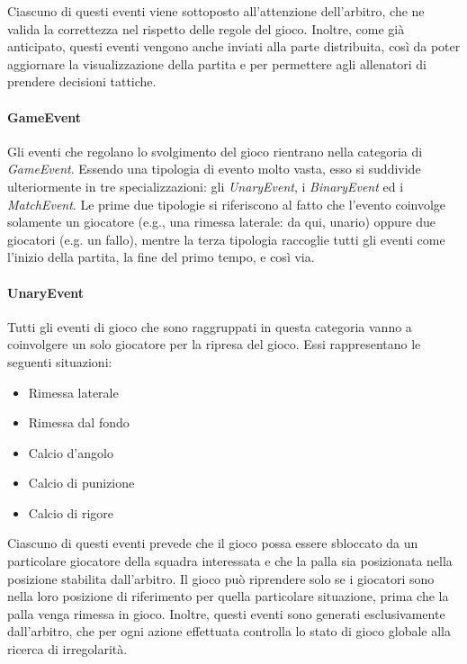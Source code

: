 Ciascuno di questi eventi viene sottoposto all'attenzione dell'arbitro, che ne valida la correttezza nel rispetto delle regole del gioco. Inoltre, come già anticipato, questi eventi vengono anche inviati alla parte distribuita, così da poter aggiornare la visualizzazione della partita e per permettere agli allenatori di prendere decisioni tattiche.

\paragraph{GameEvent} Gli eventi che regolano lo svolgimento del gioco rientrano nella categoria di \textit{GameEvent}. Essendo una tipologia di evento molto vasta, esso si suddivide ulteriormente in tre specializzazioni: gli \textit{UnaryEvent}, i \textit{BinaryEvent} ed i \textit{MatchEvent}. Le prime due tipologie si riferiscono al fatto che l'evento coinvolge solamente un giocatore (e.g., una rimessa laterale: da qui, unario) oppure due giocatori (e.g. un fallo), mentre la terza tipologia raccoglie tutti gli eventi come l'inizio della partita, la fine del primo tempo, e così via.\\

\paragraph{UnaryEvent} Tutti gli eventi di gioco che sono raggruppati in questa categoria vanno a coinvolgere un solo giocatore per la ripresa del gioco. Essi rappresentano le seguenti situazioni:

\begin{itemize}
	\item Rimessa laterale
	\item Rimessa dal fondo
	\item Calcio d'angolo
	\item Calcio di punizione
	\item Calcio di rigore
\end{itemize}

Ciascuno di questi eventi prevede che il gioco possa essere sbloccato da un particolare giocatore della squadra interessata e che la palla sia posizionata nella posizione stabilita dall'arbitro. Il gioco può riprendere solo se i giocatori sono nella loro posizione di riferimento per quella particolare situazione, prima che la palla venga rimessa in gioco. Inoltre, questi eventi sono generati esclusivamente dall'arbitro, che per ogni azione effettuata controlla lo stato di gioco globale alla ricerca di irregolarità.

